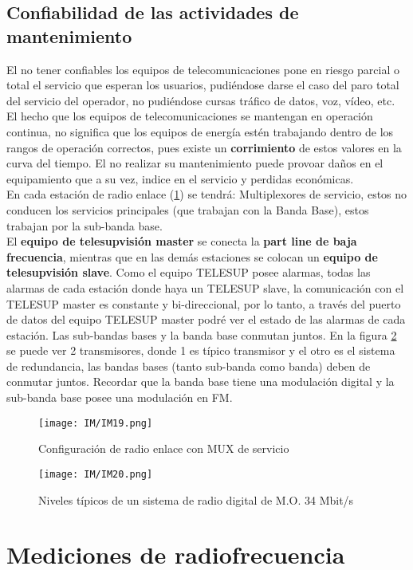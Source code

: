 \documentclass[
	12pt, %
	fleqn, %
	a4paper, %
	oneside, %
]{LegrandOrangeBook}
\begin{document}
\subsection{Confiabilidad de las actividades de mantenimiento}
El no tener confiables los equipos de telecomunicaciones pone en riesgo parcial o total el servicio que esperan los usuarios, pudiéndose darse el caso del paro total del servicio del operador, no pudiéndose cursas tráfico de datos, voz, vídeo, etc. El hecho que los equipos de telecomunicaciones se mantengan en operación continua, no significa que los equipos de energía estén trabajando dentro de los rangos de operación correctos, pues existe un \textbf{corrimiento} de estos valores en la curva del tiempo. El no realizar su mantenimiento puede provoar daños en el equipamiento que a su vez, indice en el servicio y perdidas económicas.\\
En cada estación de radio enlace (\ref{fig: radio enlace}) se tendrá: Multiplexores de servicio, estos no conducen los servicios principales (que trabajan con la Banda Base), estos trabajan por la sub-banda base. \\
El \textbf{equipo de telesupvisión master} se conecta  la \textbf{part line de baja frecuencia}, mientras que en las demás estaciones se colocan un \textbf{equipo de telesupvisión slave}. Como el equipo TELESUP posee alarmas, todas las alarmas de cada estación donde haya un TELESUP slave, la comunicación con el TELESUP master es constante y bi-direccional, por lo tanto, a través del puerto de datos del equipo TELESUP master podré ver el estado de las alarmas de cada estación. Las sub-bandas bases y la banda base conmutan juntos. En la figura \ref{fig:niveles tipicos} se puede ver 2 transmisores, donde 1 es típico transmisor y el otro es el sistema de redundancia, las bandas bases (tanto sub-banda como banda) deben de conmutar juntos. Recordar que la banda base tiene una modulación digital y la sub-banda base posee una modulación en FM.
\begin{figure}
\centering
\texttt{[image: IM/IM19.png]}
\label{fig: radio enlace}
\caption{Configuración de radio enlace con MUX de servicio}
\end{figure}
\begin{figure}[H]
\centering
\texttt{[image: IM/IM20.png]}
\caption{Niveles típicos de un sistema de radio digital de M.O. 34 Mbit/s}
\label{fig:niveles tipicos}
\end{figure}
\section{Mediciones de radiofrecuencia}
\end{document}
